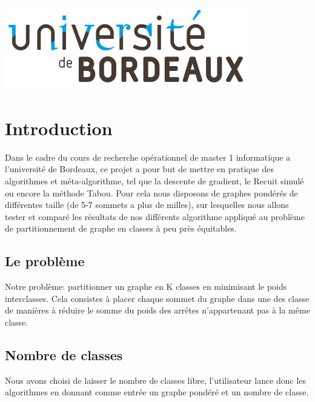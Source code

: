 \documentclass[a4paper]{article}
\begin{document}
\begin{titlepage}

\includegraphics{img/logo.png}\\[1cm]
 

\vfill
\end{titlepage}

\tableofcontents

\newpage
\section{Introduction}
Dans le cadre du cours de recherche opérationnel de master 1 informatique a l'université de Bordeaux, ce projet a pour but de mettre en pratique des algorithmes et méta-algorithme, tel que la descente de gradient, le Recuit simulé ou encore la méthode Tabou. Pour cela nous disposons de graphes pondérés de différentes taille (de 5-7 sommets a plus de milles), sur lesquelles nous allons tester et comparé les résultats de nos différents algorithme appliqué au problème de partitionnement de graphe en classes à peu près équitables.

\subsection{Le problème}
Notre problème: partitionner un graphe en K classes en minimisant le poids interclasses. Cela consistes à placer chaque sommet du graphe dans une des classe de manières à réduire le somme du poids des arrêtes n'appartenant pas à la même classe.

\subsection{Nombre de classes}
Nous avons choisi de laisser le nombre de classes libre, l'utilisateur lance donc les algorithmes en donnant comme entrée un graphe pondéré et un nombre de classe. 
\end{document}
